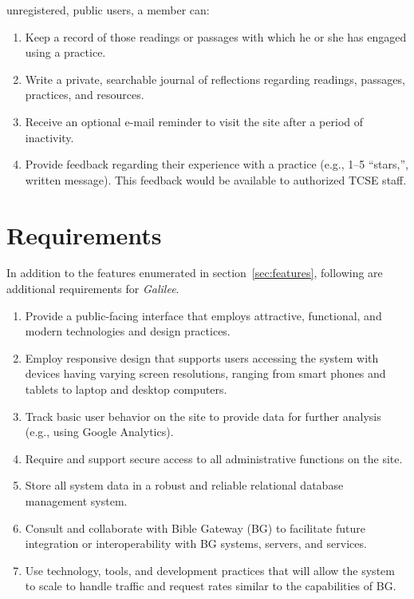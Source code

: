 \documentclass{article}
\newcommand{\gal}{\emph{Galilee}}
\newcommand{\tcse}{TCSE}
\begin{document}
\begin{enumerate}
  unregistered, public users, a member can:
  \begin{enumerate}
  \item Keep a record of those readings or passages
    with which he or she has engaged using a practice.
  \item Write a private, searchable journal of reflections
    regarding readings, passages, practices, and resources.
  \item Receive an optional e-mail reminder to visit the site
    after a period of inactivity.
  \item Provide feedback regarding their experience with a practice
    (e.g., 1--5 ``stars,'', written message).
    This feedback would be available to authorized \tcse{} staff.
  \end{enumerate}
\end{enumerate}

\section{Requirements}
\label{sec:requirements}

In addition to the features enumerated in section~\ref{sec:features},
following are additional requirements for \gal.
\begin{enumerate}
\item Provide a public-facing interface
  that employs attractive, functional, and modern
  technologies and design practices.
\item Employ responsive design that supports users accessing the system
  with devices having varying screen resolutions,
  ranging from smart phones and tablets to laptop and desktop computers.
\item Track basic user behavior on the site
  to provide data for further analysis (e.g., using Google Analytics).
\item Require and support secure access to all administrative functions
  on the site.
\item Store all system data in a robust and reliable
  relational database management system.
\item Consult and collaborate with Bible Gateway (BG)
  to facilitate future integration or interoperability
  with BG systems, servers, and services.
\item Use technology, tools, and development practices
  that will allow the system to scale
  to handle traffic and request rates
  similar to the capabilities of BG.
\end{enumerate}
\end{document}
